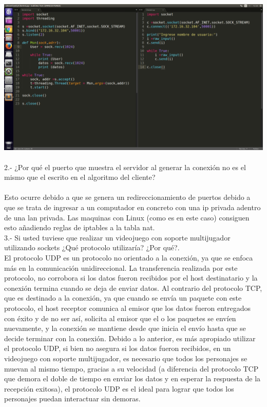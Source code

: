 \documentclass{article}
\begin{document}
\includegraphics[width=1\textwidth]{clientserver.png}\\\\

2.- ¿Por qué el puerto que muestra el servidor al generar la conexión no es el mismo que el escrito en el algoritmo del cliente?\\\\

Esto ocurre debido a que se genera un redireccionamiento de puertos debido a que se trata de ingresar a un computador en concreto con una ip privada adentro de una lan privada. Las maquinas con Linux (como es en este caso) consiguen esto añadiendo reglas de iptables a la tabla nat.\\

3.- Si usted tuviese que realizar un videojuego con soporte multijugador utilizando sockets ¿Qué protocolo utilizaría? ¿Por qué?.\\

El protocolo UDP es un protocolo no orientado a la conexión, ya que se enfoca más en la comunicación unidireccional. La transferencia realizada por este protocolo, no corrobora si los datos fueron recibidos por el host destinatario y la conexión termina cuando se deja de enviar datos. Al contrario del protocolo TCP, que es destinado a la conexión, ya que cuando se envía un paquete con este protocolo, el host receptor comunica al emisor que los datos fueron entregados con éxito y de no ser así, solicita al emisor que el o los paquetes se envíen nuevamente, y la conexión se mantiene desde que inicia el envío hasta que se decide terminar con la conexión. Debido a lo anterior, es más apropiado utilizar el protocolo UDP, si bien no asegura si los datos fueron recibidos, en un videojuego con soporte multijugador, es necesario que todos los personajes se muevan al mismo tiempo, gracias a su velocidad (a diferencia del protocolo TCP que demora el doble de tiempo en enviar los datos y en esperar la respuesta de la recepción exitosa), el protocolo UDP es el ideal para lograr que todos los personajes puedan interactuar sin demoras.\\\\
\end{document}
